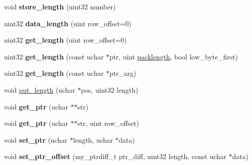 \begin{DoxyCompactItemize}
\item 
\mbox{\label{classField__blob_a76f493403352b7dd39b5e4ef6ee89d8a}} 
void {\bfseries store\+\_\+length} (uint32 number)
\item 
\mbox{\label{classField__blob_a1074887b75de1ace23b43e81cd79ef68}} 
uint32 {\bfseries data\+\_\+length} (uint row\+\_\+offset=0)
\item 
\mbox{\label{classField__blob_ab6ab64e877ebe55736d8b8baf3c06f77}} 
uint32 {\bfseries get\+\_\+length} (uint row\+\_\+offset=0)
\item 
\mbox{\label{classField__blob_ae6d31cae035570c3ba42554b148bd3dd}} 
uint32 {\bfseries get\+\_\+length} (const uchar $\ast$ptr, uint \mbox{\hyperlink{classField__blob_a4752c1fb1007b71582e6698dcea35f19}{packlength}}, bool low\+\_\+byte\+\_\+first)
\item 
\mbox{\label{classField__blob_a90654904f7c4fd305eb573a037da4c11}} 
uint32 {\bfseries get\+\_\+length} (const uchar $\ast$ptr\+\_\+arg)
\item 
void \mbox{\hyperlink{classField__blob_aa05f64033ecd31f3392d1a7f7cd1c17a}{put\+\_\+length}} (uchar $\ast$pos, uint32 length)
\item 
\mbox{\label{classField__blob_ad0714b23a81ee90209835f9832dfc2f2}} 
void {\bfseries get\+\_\+ptr} (uchar $\ast$$\ast$str)
\item 
\mbox{\label{classField__blob_ac8ecb67066e8d4187fc27054b4a15684}} 
void {\bfseries get\+\_\+ptr} (uchar $\ast$$\ast$str, uint row\+\_\+offset)
\item 
\mbox{\label{classField__blob_af9ad2b04093896133dbb7a891b1353e9}} 
void {\bfseries set\+\_\+ptr} (uchar $\ast$length, uchar $\ast$data)
\item 
\mbox{\label{classField__blob_a73eec26f63684ea5bca9bab4cd8f1cfe}} 
void {\bfseries set\+\_\+ptr\+\_\+offset} (my\+\_\+ptrdiff\+\_\+t ptr\+\_\+diff, uint32 length, const uchar $\ast$data)
\item 
\mbox{\label{classField__blob_adeed336bc9236128d039f527dc4e7165}} 

\end{DoxyCompactItemize}
